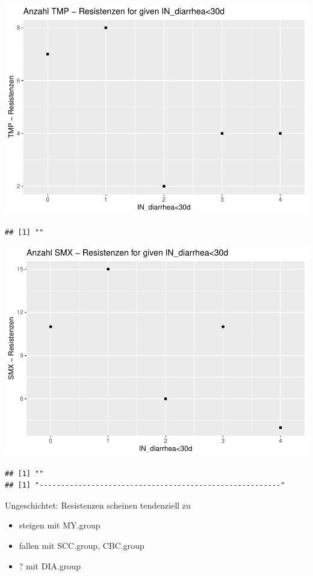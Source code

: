 \documentclass[
]{article}
\providecommand{\tightlist}{%
  \setlength{\itemsep}{0pt}\setlength{\parskip}{0pt}}
\begin{document}
\includegraphics{NResistenzen_files/figure-latex/numerical_variables-39.pdf}

\begin{verbatim}
## [1] ""
\end{verbatim}

\includegraphics{NResistenzen_files/figure-latex/numerical_variables-40.pdf}

\begin{verbatim}
## [1] ""
## [1] "--------------------------------------------------------"
\end{verbatim}

Ungeschichtet: Resistenzen scheinen tendenziell zu

\begin{itemize}
\tightlist
\item
  steigen mit MY.group
\item
  fallen mit SCC.group, CBC.group
\item
  ? mit DIA.group
\end{itemize}
\end{document}
